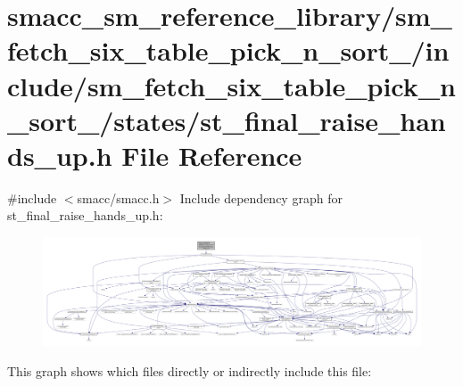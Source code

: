 \hypertarget{sm__fetch__six__table__pick__n__sort__1_2include_2sm__fetch__six__table__pick__n__sort__1_2state391b644bd58a58ea54a4093482402d0f}{}\section{smacc\+\_\+sm\+\_\+reference\+\_\+library/sm\+\_\+fetch\+\_\+six\+\_\+table\+\_\+pick\+\_\+n\+\_\+sort\+\_/include/sm\+\_\+fetch\+\_\+six\+\_\+table\+\_\+pick\+\_\+n\+\_\+sort\+\_/states/st\+\_\+final\+\_\+raise\+\_\+hands\+\_\+up.h File Reference}
\label{sm__fetch__six__table__pick__n__sort__1_2include_2sm__fetch__six__table__pick__n__sort__1_2state391b644bd58a58ea54a4093482402d0f}
{\ttfamily \#include $<$smacc/smacc.\+h$>$}\newline
Include dependency graph for st\+\_\+final\+\_\+raise\+\_\+hands\+\_\+up.\+h\+:
\nopagebreak
\begin{figure}[H]
\begin{center}
\leavevmode
\includegraphics[width=350pt]{sm__fetch__six__table__pick__n__sort__1_2include_2sm__fetch__six__table__pick__n__sort__1_2state344fe626a54b53e0783c1350c3f78087}
\end{center}
\end{figure}
This graph shows which files directly or indirectly include this file\+:
\nopagebreak
